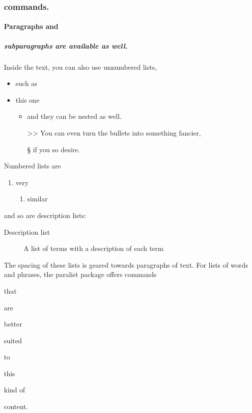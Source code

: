 \documentclass[
  digital,     %
  oneside,     %
  nosansbold,  %
  nocolorbold, %
  lof,         %
  lot,         %
]{fithesis4}
\begin{document}
\subsubsection{commands.}
\paragraph{Paragraphs and}
\subparagraph{subparagraphs are available as well.}
Inside the text, you can also use unnumbered lists,
\begin{itemize}
  \item such as
  \item this one
  \begin{itemize}
    \item     and they can be nested as well.
    \item[>>] You can even turn the bullets into something fancier,
    \item[\S] if you so desire.
  \end{itemize}
\end{itemize}
Numbered lists are
\begin{enumerate}
  \item very
  \begin{enumerate}
    \item similar
  \end{enumerate}
\end{enumerate}
and so are description lists:
\begin{description}
  \item[Description list]
    A list of terms with a description of each term
\end{description}
The spacing of these lists is geared towards paragraphs of text.
For lists of words and phrases, the \textsf{paralist} package
offers commands
\begin{compactitem}
  \item that
  \begin{compactitem}
    \item are
    \begin{compactitem}
      \item better
      \begin{compactitem}
        \item suited
      \end{compactitem}
    \end{compactitem}
  \end{compactitem}
\end{compactitem}
\begin{compactenum}
  \item to
  \begin{compactenum}
    \item this
    \begin{compactenum}
      \item kind of
      \begin{compactenum}
        \item content.
      \end{compactenum}
    \end{compactenum}
  \end{compactenum}
\end{compactenum}
\end{document}
